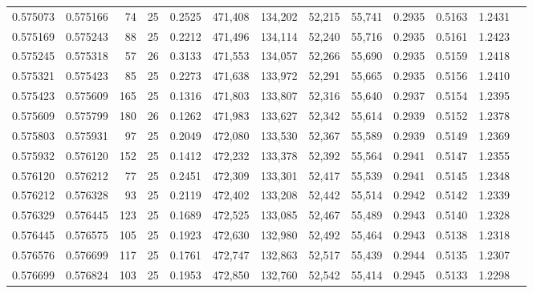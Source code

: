 \begin{tabular}{rrrrrrrrrrrrr}
0.575073 & 0.575166 &    74 &  25 &                                     0.2525 & 471,408 & 134,202 &  52,215 &  55,741 & 0.2935 & 0.5163 & 1.2431 \\
0.575169 & 0.575243 &    88 &  25 &                                     0.2212 & 471,496 & 134,114 &  52,240 &  55,716 & 0.2935 & 0.5161 & 1.2423 \\
0.575245 & 0.575318 &    57 &  26 &                                     0.3133 & 471,553 & 134,057 &  52,266 &  55,690 & 0.2935 & 0.5159 & 1.2418 \\
0.575321 & 0.575423 &    85 &  25 &                                     0.2273 & 471,638 & 133,972 &  52,291 &  55,665 & 0.2935 & 0.5156 & 1.2410 \\
0.575423 & 0.575609 &   165 &  25 &                                     0.1316 & 471,803 & 133,807 &  52,316 &  55,640 & 0.2937 & 0.5154 & 1.2395 \\
0.575609 & 0.575799 &   180 &  26 &                                     0.1262 & 471,983 & 133,627 &  52,342 &  55,614 & 0.2939 & 0.5152 & 1.2378 \\
0.575803 & 0.575931 &    97 &  25 &                                     0.2049 & 472,080 & 133,530 &  52,367 &  55,589 & 0.2939 & 0.5149 & 1.2369 \\
0.575932 & 0.576120 &   152 &  25 &                                     0.1412 & 472,232 & 133,378 &  52,392 &  55,564 & 0.2941 & 0.5147 & 1.2355 \\
0.576120 & 0.576212 &    77 &  25 &                                     0.2451 & 472,309 & 133,301 &  52,417 &  55,539 & 0.2941 & 0.5145 & 1.2348 \\
0.576212 & 0.576328 &    93 &  25 &                                     0.2119 & 472,402 & 133,208 &  52,442 &  55,514 & 0.2942 & 0.5142 & 1.2339 \\
0.576329 & 0.576445 &   123 &  25 &                                     0.1689 & 472,525 & 133,085 &  52,467 &  55,489 & 0.2943 & 0.5140 & 1.2328 \\
0.576445 & 0.576575 &   105 &  25 &                                     0.1923 & 472,630 & 132,980 &  52,492 &  55,464 & 0.2943 & 0.5138 & 1.2318 \\
0.576576 & 0.576699 &   117 &  25 &                                     0.1761 & 472,747 & 132,863 &  52,517 &  55,439 & 0.2944 & 0.5135 & 1.2307 \\
0.576699 & 0.576824 &   103 &  25 &                                     0.1953 & 472,850 & 132,760 &  52,542 &  55,414 & 0.2945 & 0.5133 & 1.2298 \\

\end{tabular}
